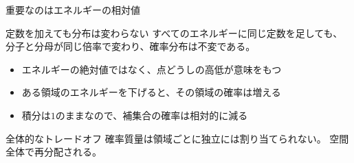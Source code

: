 \asmain
\begin{frame}{重要なのはエネルギーの相対値}
    \begin{block}{定数を加えても分布は変わらない}
        すべてのエネルギーに同じ定数を足しても、
        分子と分母が同じ倍率で変わり、確率分布は不変である。
    \end{block}
    \begin{itemize}
        \item エネルギーの絶対値ではなく、点どうしの高低が意味をもつ
        \item ある領域のエネルギーを下げると、その領域の確率は増える
        \item 積分は$1$のままなので、補集合の確率は相対的に減る
    \end{itemize}
    \begin{block}{全体的なトレードオフ}
        確率質量は領域ごとに独立には割り当てられない。
        空間全体で再分配される。
    \end{block}
\end{frame}
\assuppl
